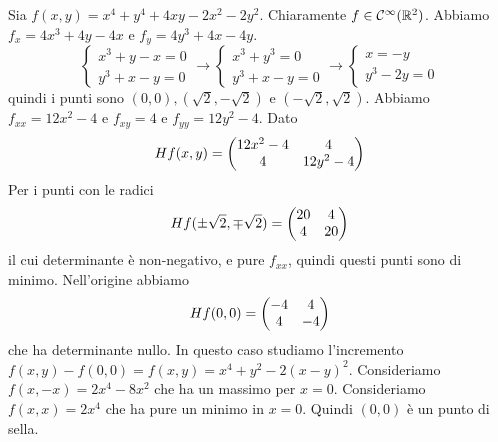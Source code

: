 \documentclass[a4paper]{article}
\begin{document}
\begin{radioactive}
\begin{snippetexample}{}
    Sia \(f(x,y) = x^4 + y^4 + 4xy -2x^2 - 2y^2\).
    Chiaramente \(f\in\mathcal{C}^\infty(\mathbb{R}^2)\).
    Abbiamo \(f_x = 4x^3 + 4y - 4x\) e \(f_y = 4y^3 + 4x - 4y\).
    \[
        \begin{cases}
            x^3 + y - x = 0 \\
            y^3 + x - y = 0
        \end{cases}
        \to
        \begin{cases}
            x^3 + y^3 = 0 \\
            y^3 + x - y = 0
        \end{cases}
        \to
        \begin{cases}
            x = -y \\
            y^3 - 2y = 0
        \end{cases}
    \]
    quindi i punti sono \((0,0), (\sqrt{2}, -\sqrt{2})\) e \((-\sqrt{2}, \sqrt{2})\). 
    Abbiamo \(f_{xx} = 12x^2 - 4\) e \(f_{xy} = 4\) e \(f_{yy} = 12y^2 - 4\).
    Dato
    \[
        H f(x,y) = \begin{pmatrix}
            12x^2 - 4 & 4 \\
            4 & 12y^2 - 4
        \end{pmatrix}
    \]
    Per i punti con le radici
    \[
        H f(\pm\sqrt2, \mp \sqrt2) = \begin{pmatrix}
            20 & 4 \\ 4 & 20
        \end{pmatrix}
    \]
    il cui determinante è non-negativo, e pure \(f_{xx}\), quindi
    questi punti sono di minimo. Nell'origine abbiamo
        \[
        H f(0,0) = \begin{pmatrix}
            -4 & 4 \\ 4 & -4
        \end{pmatrix}
    \]
    che ha determinante nullo.
    In questo caso
    studiamo l'incremento \(f(x,y) - f(0,0) = f(x,y) = x^4 + y^2 - 2{(x-y)}^2\).
    Consideriamo \(f(x, -x) = 2x^4 - 8x^2\) che ha un massimo per \(x=0\).
    Consideriamo \(f(x,x) = 2x^4\) che ha pure un minimo in \(x=0\).
    Quindi \((0,0)\) è un punto di sella.
\end{snippetexample}
\end{radioactive}
\end{document}
